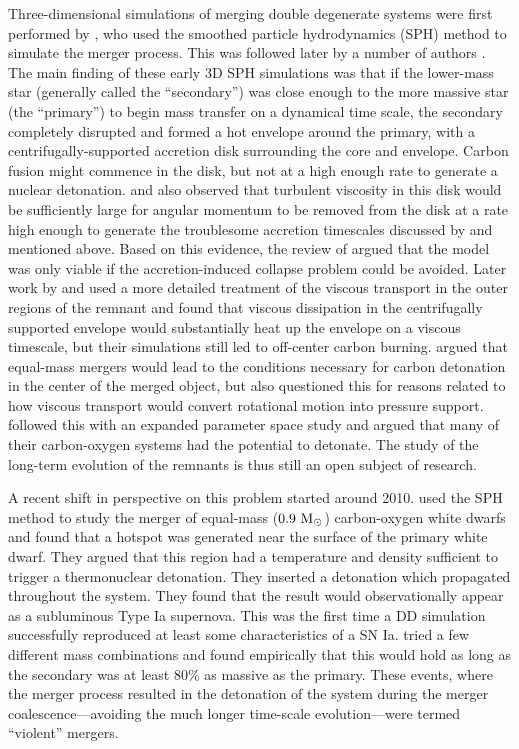 \documentclass[12pt]{article}
\begin{document}
Three-dimensional simulations of merging double degenerate systems were 
first performed by \citet{benz:1990}, who used the smoothed particle
hydrodynamics (SPH) method to simulate the merger process. This was 
followed later by a number of authors 
\citep{rasio-shapiro:1995,segretain:1997,guerrero:2004,yoon:2007,loren-aguilar:2009,raskin:2012}.
The main finding of these early 3D SPH simulations was that if the 
lower-mass star (generally called the ``secondary'') was
close enough to the more massive star (the ``primary'') to begin mass
transfer on a dynamical time scale, the secondary completely disrupted
and formed a hot envelope around the primary, with a
centrifugally-supported accretion disk surrounding the core and
envelope. Carbon fusion might commence in the disk, but not at a 
high enough rate to generate a nuclear detonation. \cite{mochkovitch-livio:1990} 
and \cite{livio:2000}  also observed that turbulent viscosity in this disk 
would be sufficiently large for angular momentum to be removed from the 
disk at a rate high enough to generate the troublesome accretion 
timescales discussed by \cite{tutukov-yungelson:1979} and mentioned above. Based on this
evidence, the review of \cite{hillebrandtniemeyer2000} argued that the
model was only viable if the accretion-induced collapse problem could
be avoided. Later work by \cite{shen:2012} and \cite{schwab:2012} used
a more detailed treatment of the viscous transport in the outer
regions of the remnant and found that viscous dissipation in the centrifugally
supported envelope would substantially heat up the envelope on a  
viscous timescale, but their simulations still led to off-center carbon
burning. \cite{vankerkwijk:2010} argued that equal-mass mergers would
lead to the conditions necessary for carbon detonation in the center
of the merged object, but \cite{shen:2012} also questioned this for
reasons related to how viscous transport would convert rotational
motion into pressure support. \cite{zhu:2013} followed this with an
expanded parameter space study and argued that many of their
carbon-oxygen systems had the potential to detonate. The study of the
long-term evolution of the remnants is thus still an open subject of
research.

A recent shift in perspective on this problem started around 2010.
\cite{pakmor:2010} used the SPH method to study the merger of 
equal-mass ($0.9\ \mathrm{M}_\odot$) carbon-oxygen white dwarfs and found 
that a hotspot was generated near the surface of the primary 
white dwarf. They argued that this region had a temperature 
and density sufficient to trigger a thermonuclear
detonation. They inserted a detonation which propagated throughout 
the system. They found that the result would observationally 
appear as a subluminous Type Ia supernova. This was the first time 
a DD simulation successfully reproduced at least some characteristics of a SN
Ia. \cite{pakmor:2011} tried a few different mass combinations and
found empirically that this would hold as long as the secondary was at
least 80\% as massive as the primary. These events, where the merger
process resulted in the detonation of the system during the merger
coalescence---avoiding the much longer time-scale evolution---were
termed ``violent'' mergers.
\end{document}
